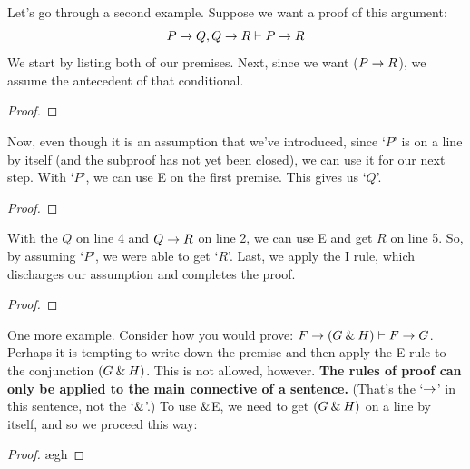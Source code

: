Let's go through a second example. Suppose we want a proof of this argument:
	$$P \rightarrow Q, Q \rightarrow R \vdash P \rightarrow R$$
We start by listing both of our premises. Next, since we want ($P \rightarrow R$), we assume the antecedent of that conditional. 
\begin{proof}
	 \pr{}
	 \pr{}
	\open
		 \as{}
	\close
\end{proof}
Now, even though it is an assumption that we've introduced, since `$P$' is on a line by itself (and the subproof has not yet been closed), we can use it for our next step. With `$P$', we can use {\eif}E on the first premise. This gives us `$Q$'. 
\begin{proof}
	 \pr{}
	 \pr{}
	\open
		\as{}
	\close
\end{proof}
With the $Q$ on line 4 and $Q \rightarrow R$ on line 2, we can use {\eif}E and get $R$ on line 5. So, by assuming `$P$', we were able to get `$R$'. Last, we apply the {\eif}I rule, which discharges our assumption and completes the proof.
\label{HSproof}
\begin{proof}
	 \pr{}
	 \pr{}
	\open
		\as{}
	\close
\end{proof}

One more example. Consider how you would prove: $F \rightarrow (G \mathbin{\&} H) \vdash F \rightarrow G$. Perhaps it is tempting to write down the premise and then apply the {\eand}E rule to the conjunction $(G \mathbin{\&} H)$. This is not allowed, however. \textbf{The rules of proof can only be applied to the main connective of a sentence.} (That's the `$\rightarrow$' in this sentence, not the `$\mathbin{\&}$'.) To use $\mathbin{\&}$E, we need to get $(G \mathbin{\&} H)$ on a line by itself, and so we proceed this way:

\begin{proof}
	 \pr{}
	\open
		\as{}
		\ae{gh}
	\close
\end{proof}


